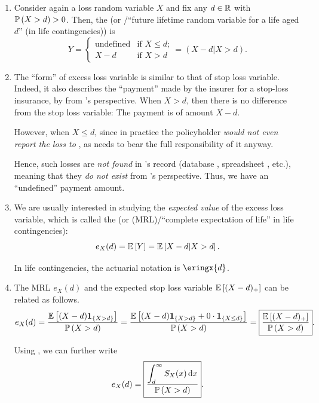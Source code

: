 \begin{enumerate}
\item Consider again a loss random variable \(X\) and fix any \(d\in\mathbb{R}\) with
\(\mathbb{P}\left(X>d\right)>0\). Then, the  (or /``future lifetime random variable for a life aged \(d\)'' (in life
contingencies)) is 
\[
Y=\begin{cases}
\text{undefined}&\text{if \(X\le d\);}\\
X-d&\text{if \(X>d\)}
\end{cases}
=(X-d|X>d).
\]

\item The ``form'' of excess loss variable is similar to that of stop loss
variable. Indeed, it also describes the ``payment'' made by the insurer
 for a stop-loss insurance, by from 's
perspective. When \(X>d\), then there is no difference from the stop loss
variable: The payment is of amount \(X-d\).

However, when \(X\le d\), since in practice the policyholder 
\emph{would not even report the loss to }, as 
needs to bear the full responsibility of it anyway.

Hence, such losses are \emph{not found} in 's record (database
, spreadsheet , etc.), meaning that
they \emph{do not exist} from 's perspective. Thus, we have an
``undefined'' payment amount.

\item We are usually interested in studying the \emph{expected value} of the
excess loss variable, which is called the  (or
 (MRL)/``complete expectation of life'' in life
contingencies):
\[
e_{X}(d)=\mathbb{E}\left[Y\right]=\mathbb{E}\left[X-d|X>d\right].
\]
\begin{note}
In life contingencies, the actuarial notation is \(\eringx{d}\).
\end{note}

\item \label{it:mrl-exp-sl-relation}
The MRL \(e_X(d)\) and the expected stop loss variable \(\mathbb{E}\left[(X-d)_{+}\right]\) can
be related as follows.
\[
e_X(d)=\frac{\mathbb{E}\left[(X-d)\mathbf{1}_{\left\{X>d\right\}}\right]}{\mathbb{P}\left(X>d\right)}
=\frac{\mathbb{E}\left[(X-d)\mathbf{1}_{\left\{X>d\right\}}+0\cdot\mathbf{1}_{\left\{X\le d\right\}}\right]}{\mathbb{P}\left(X>d\right)}
=\boxed{\frac{\mathbb{E}\left[(X-d)_{+}\right]}{\mathbb{P}\left(X>d\right)}}.
\]
\begin{note}
Using , we can further write
\[
e_X(d)=\boxed{\frac{\displaystyle \int_{d}^{\infty}S_X(x)\dd{x}}{\mathbb{P}\left(X>d\right)}}.
\]
\end{note}
\end{enumerate}
